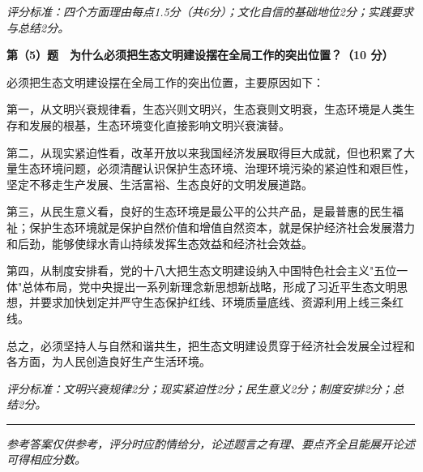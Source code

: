 \documentclass[12pt, a4paper]{article}
\newcommand{\examrule}{\noindent\rule{\linewidth}{0.6pt}}
\begin{document}
\begin{answerbox}
\textit{评分标准：四个方面理由每点1.5分（共6分）；文化自信的基础地位2分；实践要求与总结2分。}

\vspace{6pt}
\textbf{第（5）题　为什么必须把生态文明建设摆在全局工作的突出位置？（10 分）}

必须把生态文明建设摆在全局工作的突出位置，主要原因如下：

第一，从文明兴衰规律看，生态兴则文明兴，生态衰则文明衰，生态环境是人类生存和发展的根基，生态环境变化直接影响文明兴衰演替。

第二，从现实紧迫性看，改革开放以来我国经济发展取得巨大成就，但也积累了大量生态环境问题，必须清醒认识保护生态环境、治理环境污染的紧迫性和艰巨性，坚定不移走生产发展、生活富裕、生态良好的文明发展道路。

第三，从民生意义看，良好的生态环境是最公平的公共产品，是最普惠的民生福祉；保护生态环境就是保护自然价值和增值自然资本，就是保护经济社会发展潜力和后劲，能够使绿水青山持续发挥生态效益和经济社会效益。

第四，从制度安排看，党的十八大把生态文明建设纳入中国特色社会主义"五位一体"总体布局，党中央提出一系列新理念新思想新战略，形成了习近平生态文明思想，并要求加快划定并严守生态保护红线、环境质量底线、资源利用上线三条红线。

总之，必须坚持人与自然和谐共生，把生态文明建设贯穿于经济社会发展全过程和各方面，为人民创造良好生产生活环境。

\textit{评分标准：文明兴衰规律2分；现实紧迫性2分；民生意义2分；制度安排2分；总结2分。}

\end{answerbox}

\vspace{12pt}
\examrule
\begin{center}
  \textit{参考答案仅供参考，评分时应酌情给分，论述题言之有理、要点齐全且能展开论述可得相应分数。}
\end{center}
\end{document}
